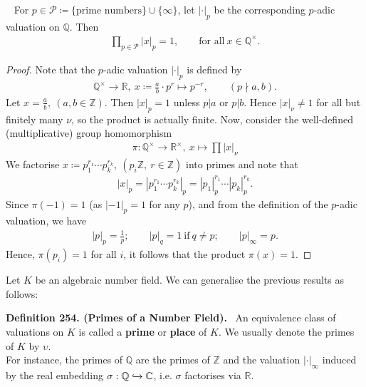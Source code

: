 \documentclass[12pt,a4paper,footinclude=true,headinclude=true]{scrbook} %
\newenvironment{theorem}[2][]
{\renewcommand\theinnercustomthm{#2}\innercustomthm[#1]
\begin{mdframed}[backgroundcolor=yellow!20]\ }
{\end{mdframed}\endinnercustomthm}
\newenvironment{definition}[2][Definition]
    { \begin{mdframed}[backgroundcolor=gray!20] \textbf{#1 #2.}\ }
    {  \end{mdframed}}
\begin{document}
\begin{theorem}{253. (Product Formula)}
    \newline For $p\in\mathcal{P}\coloneqq\{\text{prime numbers}\}\cup\{\infty\}$, let $|\cdot|_p$ be the corresponding $p$-adic valuation on $\mathbb{Q}$. Then
    \begin{align*}
        \prod_{p\in\mathcal{P}}|x|_p=1,\qquad\text{for all}\ x\in\mathbb{Q}^\times.
    \end{align*}
\end{theorem}
\begin{proof}
    Note that the $p$-adic valuation $|\cdot|_p$ is defined by
    \begin{align*}
        \mathbb{Q}^\times\longrightarrow\mathbb{R},\ x\coloneqq \tfrac{a}{b}\cdot p^r\longmapsto p^{-r},\qquad(p\nmid a,b).
    \end{align*}
    Let $x=\frac{a}{b},\ (a,b\in\mathbb{Z})$. Then $|x|_p=1$ unless $p|a$ or $p|b$. Hence $|x|_\nu\neq1$ for all but finitely many $\nu$, so the product is actually finite. Now, consider the well-defined (multiplicative) group homomorphism 
    \begin{align*}
        \pi:\mathbb{Q}^\times\longrightarrow\mathbb{R}^\times,\ x\longmapsto\prod|x|_\nu
    \end{align*}
    We factorise $x\coloneqq p_1^{r_1}\cdots p_k^{r_k},\ (p_i\mathbb{Z},\ r\in\mathbb{Z})$ into primes and note that
    \begin{align*}
        |x|_p=|p_1^{r_1}\cdots p_k^{r_k}|_p=|p_1|_p^{r_1}\cdots|p_k|_p^{r_k}.
    \end{align*}
    Since $\pi(-1)=1$ (as $|-1|_p=1$ for any $p$), and from the definition of the $p$-adic valuation, we have
    \begin{align*}
        |p|_p=\tfrac{1}{p};\qquad |p|_q=1\ \text{if}\ q\neq p;\qquad |p|_\infty=p.
    \end{align*}
    Hence, $\pi(p_i)=1$ for all $i$, it follows that the product $\pi(x)=1$.
\end{proof}

Let $K$ be an algebraic number field. We can generalise the previous results as follows:
\begin{definition}{254. (Primes of a Number Field)}
    \newline An equivalence class of valuations on $K$ is called a \textbf{prime} or \textbf{place} of $K$. We usually denote the primes of $K$ by $\upsilon$.\\
    For instance, the primes of $\mathbb{Q}$ are the primes of $\mathbb{Z}$ and the valuation $|\cdot|_\infty$ induced by the real embedding $\sigma:\mathbb{Q}\xhookrightarrow{} \mathbb{C}$, i.e. $\sigma$ factorises via $\mathbb{R}$.
\end{definition}
\end{document}
